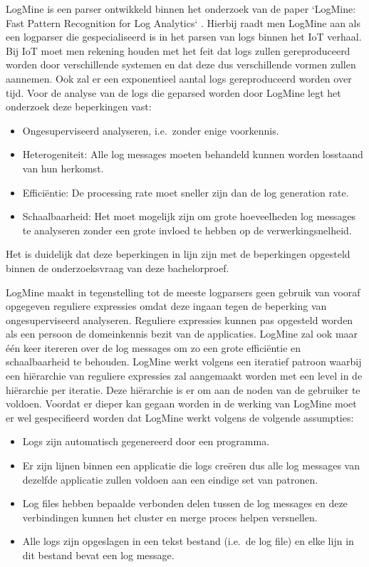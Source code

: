 LogMine is een parser ontwikkeld binnen het onderzoek van de paper `LogMine: Fast Pattern Recognition for Log Analytics` \autocite{hamooni2016logmine}. Hierbij raadt men LogMine aan als een logparser die gespecialiseerd is in het parsen van logs binnen het IoT verhaal. Bij IoT moet men rekening houden met het feit dat logs zullen gereproduceerd worden door verschillende systemen en dat deze dus verschillende vormen zullen aannemen. Ook zal er een exponentieel aantal logs gereproduceerd worden over tijd. Voor de analyse van de logs die geparsed worden door LogMine legt het onderzoek deze beperkingen vast: 
\begin{itemize}
    \item Ongesuperviseerd analyseren, i.e.\ zonder enige voorkennis.
    \item Heterogeniteit: Alle log messages moeten behandeld kunnen worden losstaand van hun herkomst.
    \item Efficiëntie: De processing rate moet sneller zijn dan de log generation rate.
    \item Schaalbaarheid: Het moet mogelijk zijn om grote hoeveelheden log messages te analyseren zonder een grote invloed te hebben op de verwerkingsnelheid.
\end{itemize}
Het is duidelijk dat deze beperkingen in lijn zijn met de beperkingen opgesteld binnen de onderzoeksvraag van deze bachelorproef.

LogMine maakt in tegenstelling tot de meeste logparsers geen gebruik van vooraf opgegeven reguliere expressies omdat deze ingaan tegen de beperking van ongesuperviseerd analyseren. Reguliere expressies kunnen pas opgesteld worden als een persoon de domeinkennis bezit van de applicaties. LogMine zal ook maar één keer itereren over de log messages om zo een grote efficiëntie en schaalbaarheid te behouden. LogMine werkt volgens een iteratief patroon waarbij een hiërarchie van reguliere expressies zal aangemaakt worden met een level in de hiërarchie per iteratie. Deze hiërarchie is er om aan de noden van de gebruiker te voldoen. Voordat er dieper kan gegaan worden in de werking van LogMine moet er wel gespecifieerd worden dat LogMine werkt volgens de volgende assumpties:
\begin{itemize}
    \item Logs zijn automatisch gegenereerd door een programma.
    \item Er zijn lijnen binnen een applicatie die logs creëren dus alle log messages van dezelfde applicatie zullen voldoen aan een eindige set van patronen.
    \item Log files hebben bepaalde verbonden delen tussen de log messages en deze verbindingen kunnen het cluster en merge proces helpen versnellen.
    \item Alle logs zijn opgeslagen in een tekst bestand (i.e.\ de log file) en elke lijn in dit bestand bevat een log message.
\end{itemize}

